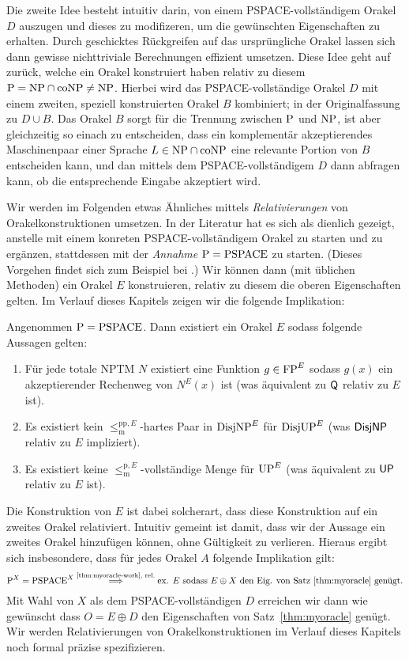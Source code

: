 Die zweite Idee besteht intuitiv darin, von einem PSPACE-vollständigem Orakel $D$ auszugen und dieses zu modifizeren, um die gewünschten Eigenschaften zu erhalten. Durch geschicktes Rückgreifen auf das ursprüngliche Orakel lassen sich dann gewisse nichttriviale Berechnungen effizient umsetzen. Diese Idee geht auf \textcite{baker_relativizations_1975} zurück, welche ein Orakel konstruiert haben relativ zu diesem $\P=\NP\cap\coNP\neq\NP$. Hierbei wird das PSPACE-vollständige Orakel $D$ mit einem zweiten, speziell konstruierten Orakel $B$ kombiniert; in der Originalfassung zu $D\cup B$. Das Orakel $B$ sorgt für die Trennung zwischen $\P$ und $\NP$, ist aber gleichzeitig so einach zu entscheiden, dass ein komplementär akzeptierendes Maschinenpaar einer Sprache $L\in\NP\cap\coNP$ eine relevante Portion von $B$ entscheiden kann, und dan mittels dem PSPACE-vollständigem $D$ dann abfragen kann, ob die entsprechende Eingabe akzeptiert wird.

Wir werden im Folgenden etwas Ähnliches mittels \emph{Relativierungen} von Orakelkonstruktionen umsetzen.
In der Literatur hat es sich als dienlich gezeigt, anstelle mit einem konreten PSPACE-vollständigem Orakel zu starten und zu ergänzen, stattdessen mit der \emph{Annahme} $\P=\mathrm{PSPACE}$ zu starten. (Dieses Vorgehen findet sich zum Beispiel bei \cites{blum_generic_1987}{fortnow_separability_2002}{fenner_oracle_2003}.) 
Wir können dann (mit üblichen Methoden) ein Orakel $E$ konstruieren, relativ zu diesem die oberen Eigenschaften gelten. Im Verlauf dieses Kapitels zeigen wir die folgende Implikation:
\begin{theorem}\label{thm:myoracle-work}
    Angenommen $\P=\mathrm{PSPACE}$. Dann existiert ein Orakel $E$ sodass folgende Aussagen gelten:
    \begin{enumerate}
        \item Für jede totale NPTM $N$ existiert eine Funktion $g\in\FP^E$ sodass $g(x)$ ein akzeptierender Rechenweg von $N^E(x)$ ist (was äquivalent zu $\hQ$ relativ zu $E$ ist).
        \item Es existiert kein $\leq_\mathrm{m}^{\mathrm{pp},E}$-hartes Paar in $\DisjNP^E$ für $\DisjUP^E$ (was $\hDisjNP$ relativ zu $E$ impliziert).
        \item Es existiert keine $\leq_\mathrm{m}^{\mathrm{p},E}$-vollständige Menge für $\UP^E$ (was äquivalent zu $\hUP$ relativ zu $E$ ist).
    \end{enumerate}
\end{theorem}
Die Konstruktion von $E$ ist dabei solcherart, dass diese Konstruktion auf ein zweites Orakel relativiert. 
Intuitiv gemeint ist damit, dass wir der Aussage ein zweites Orakel hinzufügen können, ohne Gültigkeit zu verlieren. Hieraus ergibt sich insbesondere, dass für jedes Orakel $A$ folgende Implikation gilt:
\[ \P^X=\mathrm{PSPACE}^X \stackrel{\text{\ref{thm:myoracle-work}, rel.}}{\implies} \text{ex. $E$ sodass $E\oplus X$ den Eig. von Satz~\ref{thm:myoracle} genügt.} \]
Mit Wahl von $X$ als dem PSPACE-vollständigen $D$ erreichen wir dann wie gewünscht dass $O=E\oplus D$ den Eigenschaften von Satz~\ref{thm:myoracle} genügt.
Wir werden Relativierungen von Orakelkonstruktionen im Verlauf dieses Kapitels noch formal präzise spezifizieren.


